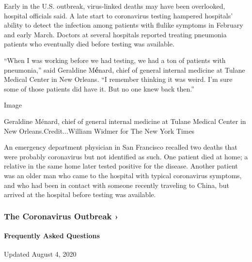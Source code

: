Early in the U.S. outbreak, virus-linked deaths may have been
overlooked, hospital officials said. A late start to coronavirus testing
hampered hospitals' ability to detect the infection among patients with
flulike symptoms in February and early March. Doctors at several
hospitals reported treating pneumonia patients who eventually died
before testing was available.

``When I was working before we had testing, we had a ton of patients
with pneumonia,'' said Geraldine M\textbf{é}nard, chief of general
internal medicine at Tulane Medical Center in New Orleans. ``I remember
thinking it was weird. I'm sure some of those patients did have it. But
no one knew back then.''

Image

Geraldine Ménard, chief of general internal medicine at Tulane Medical
Center in New Orleans.Credit...William Widmer for The New York Times

An emergency department physician in San Francisco recalled two deaths
that were probably coronavirus but not identified as such. One patient
died at home; a relative in the same home later tested positive for the
disease. Another patient was an older man who came to the hospital with
typical coronavirus symptoms, and who had been in contact with someone
recently traveling to China, but arrived at the hospital before testing
was available.

\href{https://www.nytimes3xbfgragh.onion/news-event/coronavirus?action=click\&pgtype=Article\&state=default\&region=MAIN_CONTENT_3\&context=storylines_faq}{}

\hypertarget{the-coronavirus-outbreak-}{%
\subsubsection{The Coronavirus Outbreak
›}\label{the-coronavirus-outbreak-}}

\hypertarget{frequently-asked-questions}{%
\paragraph{Frequently Asked
Questions}\label{frequently-asked-questions}}

Updated August 4, 2020

